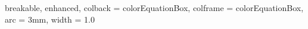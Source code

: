 {
  breakable,
  enhanced,
  colback  = colorEquationBox,
  colframe = colorEquationBox,
  arc      = 3mm,
  width    = 1.0 \linewidth
}



